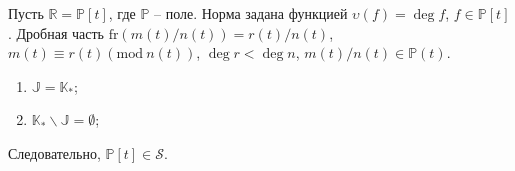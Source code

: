 \documentclass[_00_dissertation.tex]{subfiles}
\begin{document}
\begin{example}\label{example:thm1:P[t]}
    Пусть $\mathbb{R}=\mathbb{P}[t]$, где $\mathbb{P}$ -- поле.
    Норма задана функцией $\upsilon(f)=\deg f$, $f \in \mathbb{P}[t]$.
    Дробная часть $\textrm{fr}(m(t)/n(t))=r(t)/n(t)$, $m(t)\equiv r(t)(\textrm{mod}\ n(t))$, $\deg r<\deg n$, $m(t)/n(t) \in \mathbb{P}(t).$

    \begin{enumerate}
        \item $\mathbb{J}=\mathbb{K}_{*}$;

        \item $\mathbb{K}_{*}\backslash\mathbb{J} = \emptyset$;
    \end{enumerate}

    Следовательно, $\mathbb{P}[t] \in \mathcal{S}$.
\end{example}
\end{document}
